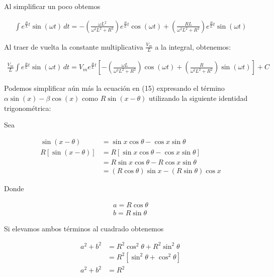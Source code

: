 \documentclass{article}
\begin{document}
\noindent Al simplificar un poco obtemos

\begin{align}
	\int e^{\frac{R}{L}t}\sin(\omega t) \, dt = - \left( \frac{\omega L^2}{\omega^2 L^2 + R^2} \right) e^{\frac{R}{L}t} \cos (\omega t) +  \left(\frac{RL}{\omega^2 L^2 + R^2} \right) e^{\frac{R}{L}t} \sin (\omega t) \nonumber
\end{align}

\noindent Al traer de vuelta la constante multiplicativa $\frac{V_m}{L}$ a la integral, obtenemos:

\begin{align}
	\frac{V_m}{L} \int e^{\frac{R}{L}t}\sin(\omega t) \, dt = V_m e^{\frac{R}{L}t} \left[ - \left( \frac{\omega L}{\omega^2 L^2 + R^2} \right) \cos (\omega t) + \left(\frac{R}{\omega^2 L^2 + R^2} \right) \sin (\omega t) \right] + C
\end{align}

\noindent Podemos simplificar aún más la ecuación en (15) expresando el término $\alpha \sin(x) - \beta \cos(x)$ como $R \sin (x - \theta)$ utilizando la siguiente identidad trigonométrica:

\noindent Sea 

\begin{align}
	\sin (x - \theta) &= \sin x \cos \theta - \cos x \sin \theta \nonumber \\
	R \left[ \sin (x - \theta) \right] &= R[\sin x \cos \theta - \cos x \sin \theta] \nonumber \\
	&= R\sin x \cos \theta - R \cos x \sin \theta \nonumber \\
	&= (R \cos \theta)\sin x - (R \sin \theta) \cos x \nonumber
\end{align}

\noindent Donde

\begin{align}
	a = R \cos \theta \nonumber \\
	b = R \sin \theta \nonumber
\end{align}

\noindent Si elevamos ambos términos al cuadrado obtenemos

\begin{align}
	a^2 + b^2 &= R^2 \cos^2 \theta + R^2 \sin^2 \theta \nonumber \\
	&= R^2 \left[  \sin^2 \theta + \cos^2 \theta \right] \nonumber \\
	a^2 + b^2 &= R^2 \nonumber
\end{align}
\end{document}

